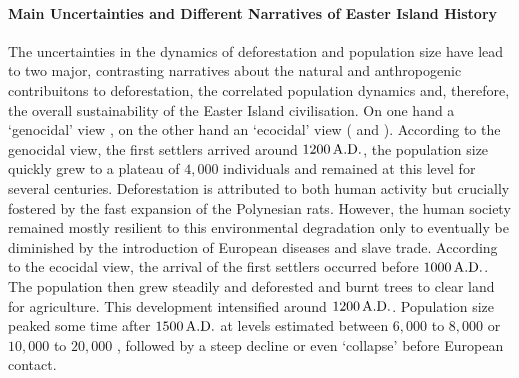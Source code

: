\paragraph{Main Uncertainties and Different Narratives of Easter Island History}
The uncertainties in the dynamics of deforestation and population size have lead to two major, contrasting narratives about the natural and anthropogenic contribuitons to deforestation, the correlated population dynamics and, therefore, the overall sustainability of the Easter Island civilisation.
On one hand a `genocidal' view \citep{Hunt2007}, on the other hand an `ecocidal' view (\citet{Diamond2011} and \citet{Bahn2017}).
According to the genocidal view, the first settlers arrived around $1200\,{\rm A.D.}$, the population size quickly grew to a plateau of $4,000$ individuals and remained at this level for several centuries. Deforestation is attributed to both human activity but crucially fostered by the fast expansion of the Polynesian rats. 
However, the human society remained mostly resilient to this environmental degradation only to eventually be diminished by the introduction of European diseases and slave trade. 
According to the ecocidal view, the arrival of the first settlers occurred before $1000\, {\rm A.D.}$. 
The population then grew steadily and deforested and burnt trees to clear land for agriculture. This development intensified around $1200\, {\rm A.D.}$. 
Population size peaked some time after $1500\, {\rm A.D.}$ at levels estimated between $6,000$ to $8,000$ or $10,000$ to $20,000$ \citep{Bahn2017}, followed by a steep decline or even `collapse' \citep{Diamond2011} before European contact.

